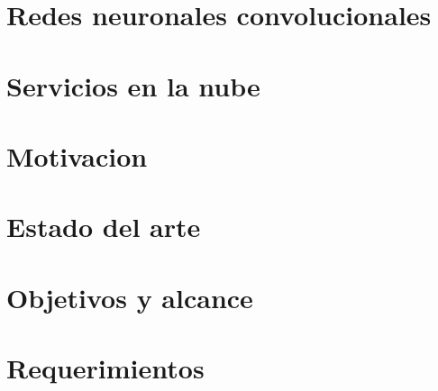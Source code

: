 \section{Redes neuronales convolucionales}

\section{Servicios en la nube}

\section{Motivacion}

\section{Estado del arte}

\section{Objetivos y alcance}

\section{Requerimientos}



